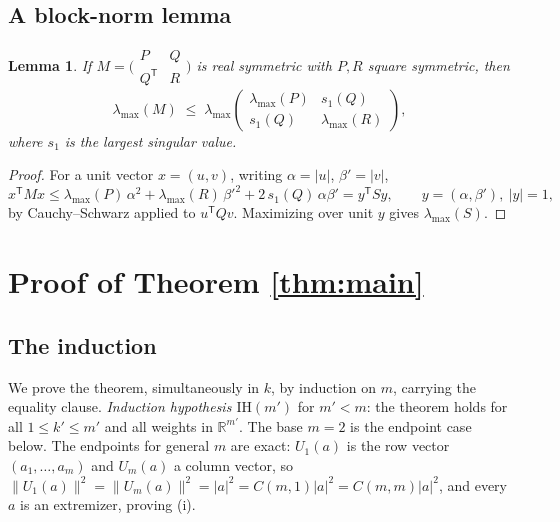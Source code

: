 \documentclass[11pt]{article}
\newtheorem{lemma}{Lemma}
\theoremstyle{remark}
\begin{document}
\subsection{A block-norm lemma}\label{subsec:blocknorm}

\begin{lemma}\label{lem:block}
If $M=\bigl(\begin{smallmatrix}P&Q\\ Q^{\mathsf T}&R\end{smallmatrix}\bigr)$
is real symmetric with $P,R$ square symmetric, then
\[
\lambda_{\max}(M)\;\le\;
\lambda_{\max}\begin{pmatrix}\lambda_{\max}(P)&s_1(Q)\\ s_1(Q)&\lambda_{\max}(R)\end{pmatrix},
\]
where $s_1$ is the largest singular value.
\end{lemma}
\begin{proof}
For a unit vector $x=(u,v)$, writing $\alpha=|u|$, $\beta'=|v|$,
\[
x^{\mathsf T}Mx \le \lambda_{\max}(P)\,\alpha^2+\lambda_{\max}(R)\,\beta'^{2}
+2\,s_1(Q)\,\alpha\beta' = y^{\mathsf T}Sy,
\qquad y=(\alpha,\beta'),\ |y|=1,
\]
by Cauchy--Schwarz applied to $u^{\mathsf T}Qv$. Maximizing over unit $y$
gives $\lambda_{\max}(S)$.
\end{proof}

\section{Proof of Theorem \ref{thm:main}}\label{sec:proof}

\subsection{The induction}\label{subsec:induction}

We prove the theorem, simultaneously in $k$, by induction on $m$, carrying
the equality clause. \emph{Induction hypothesis $\mathrm{IH}(m')$} for
$m'<m$: the theorem holds for all $1\le k'\le m'$ and all weights in
$\mathbb{R}^{m'}$. The base $m=2$ is the endpoint case below. The endpoints
for general $m$ are exact: $U_1(a)$ is the row vector $(a_1,\dots,a_m)$ and
$U_m(a)$ a column vector, so
$\|U_1(a)\|^2=\|U_m(a)\|^2=|a|^2=C(m,1)|a|^2=C(m,m)|a|^2$, and every $a$
is an extremizer, proving (i).
\end{document}
